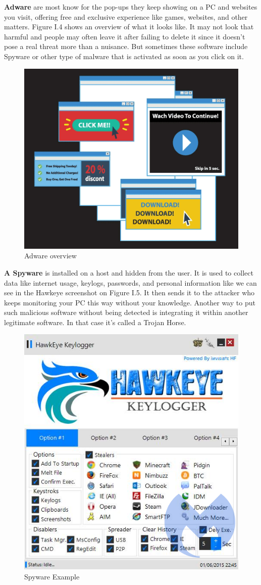 \textbf{Adware} are most know for the pop-ups they keep showing on a PC and websites you visit, offering free and exclusive experience like games, websites, and other matters. Figure I.4 shows an overview of what it looks like. It may not look that harmful and people may often leave it after failing to delete it since it doesn't pose a real threat more than a nuisance. But sometimes these software include Spyware or other type of malware that is activated as soon as you click on it.\\
\begin{figure}[H]
\centering
\includegraphics[width=0.5\columnwidth]{Figures/adware.png}
\caption{Adware overview \cite{adware}}
\end{figure}
\textbf{A Spyware} is installed on a host and hidden from the user. It is used to collect data like internet usage, keylogs, passwords, and personal information like we can see in the Hawkeye\cite{hawkeye} screenshot on Figure I.5. It then sends it to the attacker who keeps monitoring your PC this way without your knowledge. Another way to put such malicious software without being detected is integrating it within another legitimate software. In that case it's called a Trojan Horse.\\
\begin{figure}[H]
\centering
\includegraphics[width=0.6\columnwidth]{Figures/spyware.png}
\caption{Spyware Example \cite{spyware}}
\end{figure}
